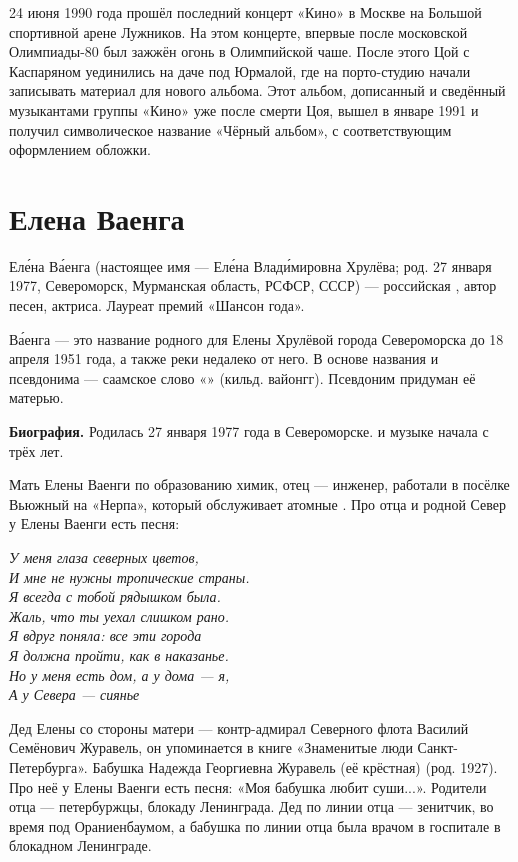 24 июня 1990 года прошёл последний концерт «Кино» в Москве на Большой спортивной арене Лужников. На этом концерте, впервые после московской Олимпиады-80 был зажжён огонь в Олимпийской чаше. После этого Цой с Каспаряном уединились на даче под Юрмалой, где на порто-студию начали записывать материал для нового альбома. Этот альбом, дописанный и сведённый музыкантами группы «Кино» уже после смерти Цоя, вышел в январе 1991 и получил символическое название «Чёрный альбом», с соответствующим оформлением обложки.

\newpage
\section{Елена Ваенга}
Ел\'{е}на В\'{а}енга (настоящее имя --- Ел\'{е}на Влад\'{и}мировна Хрулёва; род. 27 января 1977, Североморск, Мурманская область, РСФСР, СССР) --- российская , автор песен, актриса. Лауреат премий «Шансон года».

В\'{а}енга --- это название родного для Елены Хрулёвой города Североморска до 18 апреля 1951 года, а также реки недалеко от него. В основе названия и псевдонима --- саамское слово «» (кильд. вайонгг). Псевдоним придуман её матерью.

\textbf{Биография.} Родилась 27 января 1977 года в Североморске.  и  музыке начала с трёх лет.

Мать Елены Ваенги по образованию химик, отец --- инженер, работали в посёлке Вьюжный на  «Нерпа», который обслуживает атомные . Про отца и родной Север у Елены Ваенги есть песня:

{\it У меня глаза северных цветов,\\
И мне не нужны тропические страны.\\
Я всегда с тобой рядышком была.\\
Жаль, что ты уехал слишком рано.\\
Я вдруг поняла: все эти города\\
Я должна пройти, как в наказанье.\\
Но у меня есть дом, а у дома --- я,\\
А у Севера --- сиянье}

Дед Елены со стороны матери --- контр-адмирал Северного флота Василий Семёнович Журавель, он упоминается в книге «Знаменитые люди Санкт-Петербурга». Бабушка Надежда Георгиевна Журавель (её крёстная) (род. 1927). Про неё у Елены Ваенги есть песня: «Моя бабушка любит суши...». Родители отца ---  петербуржцы,  блокаду Ленинграда. Дед по линии отца --- зенитчик, во время   под Ораниенбаумом, а бабушка по линии отца была врачом в госпитале в блокадном Ленинграде.

